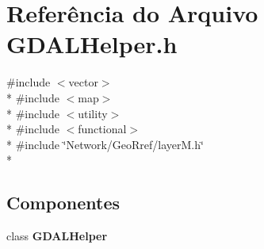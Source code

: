 \section{Referência do Arquivo G\+D\+A\+L\+Helper.\+h}
\label{_g_d_a_l_helper_8h}
{\ttfamily \#include $<$vector$>$}\\*
{\ttfamily \#include $<$map$>$}\\*
{\ttfamily \#include $<$utility$>$}\\*
{\ttfamily \#include $<$functional$>$}\\*
{\ttfamily \#include \char`\"{}Network/\+Geo\+Rref/layer\+M.\+h\char`\"{}}\\*
\subsection*{Componentes}
\begin{DoxyCompactItemize}
\item 
class {\bf G\+D\+A\+L\+Helper}
\end{DoxyCompactItemize}
